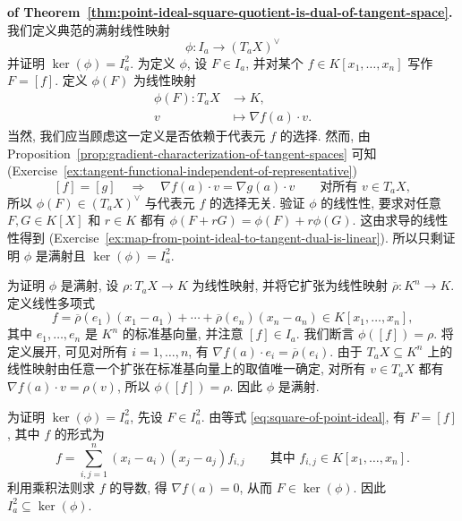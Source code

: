 \begin{Proof}\textbf{of Theorem~\ref{thm:point-ideal-square-quotient-is-dual-of-tangent-space}.}\quad
我们定义典范的满射线性映射
\[
  \phi:I_{a}\to(T_{a}X)^{\vee}
\]
并证明 $\ker(\phi)=I_{a}^{2}$. 为定义 $\phi$, 设 $F\in I_{a}$, 并对某个 $f\in K[x_{1},\ldots,x_{n}]$ 写作 $F=[f]$. 定义 $\phi(F)$ 为线性映射
\[
  \begin{aligned}
    \phi(F):T_{a}X&\to K,\\
    v&\mapsto\nabla f(a)\cdot v.
  \end{aligned}
\]
当然, 我们应当顾虑这一定义是否依赖于代表元 $f$ 的选择. 然而, 由 Proposition~\ref{prop:gradient-characterization-of-tangent-spaces} 可知 (Exercise~\ref{ex:tangent-functional-independent-of-representative})
\[
  [f]=[g]\quad\Longrightarrow\quad
  \nabla f(a)\cdot v=\nabla g(a)\cdot v\qquad\text{对所有 }v\in T_{a}X,
\]
所以 $\phi(F)\in(T_{a}X)^{\vee}$ 与代表元 $f$ 的选择无关. 验证 $\phi$ 的线性性, 要求对任意 $F,G\in K[X]$ 和 $r\in K$ 都有 $\phi(F+rG)=\phi(F)+r\phi(G)$. 这由求导的线性性得到 (Exercise~\ref{ex:map-from-point-ideal-to-tangent-dual-is-linear}). 所以只剩证明 $\phi$ 是满射且 $\ker(\phi)=I_{a}^{2}$.

为证明 $\phi$ 是满射, 设 $\rho:T_{a}X\to K$ 为线性映射, 并将它扩张为线性映射 $\overline{\rho}:K^{n}\to K$. 定义线性多项式
\[
  f=\overline{\rho}(e_{1})(x_{1}-a_{1})+\cdots+\overline{\rho}(e_{n})(x_{n}-a_{n})
    \in K[x_{1},\ldots,x_{n}],
\]
其中 $e_{1},\ldots,e_{n}$ 是 $K^{n}$ 的标准基向量, 并注意 $[f]\in I_{a}$. 我们断言 $\phi([f])=\rho$. 将定义展开, 可见对所有 $i=1,\ldots,n$, 有 $\nabla f(a)\cdot e_{i}=\overline{\rho}(e_{i})$. 由于 $T_{a}X\subseteq K^{n}$ 上的线性映射由任意一个扩张在标准基向量上的取值唯一确定, 对所有 $v\in T_{a}X$ 都有 $\nabla f(a)\cdot v=\rho(v)$, 所以 $\phi([f])=\rho$. 因此 $\phi$ 是满射.

为证明 $\ker(\phi)=I_{a}^{2}$, 先设 $F\in I_{a}^{2}$. 由等式 \eqref{eq:square-of-point-ideal}, 有 $F=[f]$, 其中 $f$ 的形式为
\[
  f=\sum_{i,j=1}^{n}(x_{i}-a_{i})(x_{j}-a_{j})f_{i,j}
  \qquad\text{其中 }f_{i,j}\in K[x_{1},\ldots,x_{n}].
\]
利用乘积法则求 $f$ 的导数, 得 $\nabla f(a)=0$, 从而 $F\in\ker(\phi)$. 因此 $I_{a}^{2}\subseteq\ker(\phi)$.


\end{Proof}
